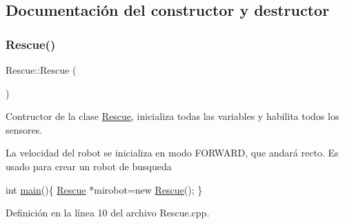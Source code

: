 \subsection{Documentación del constructor y destructor}
\mbox{\label{classRescue_a307e122659d2fbe9e17f51108951752f_a307e122659d2fbe9e17f51108951752f}} 
\subsubsection{\texorpdfstring{Rescue()}{Rescue()}}
{\footnotesize\ttfamily Rescue\+::\+Rescue (\begin{DoxyParamCaption}{ }\end{DoxyParamCaption})}



Contructor de la clase \hyperlink{classRescue}{Rescue}, inicializa todas las variables y habilita todos los sensores. 

La velocidad del robot se inicializa en modo F\+O\+R\+W\+A\+RD, que andará recto. Es usado para crear un robot de busqueda 
\begin{DoxyCode}
\textcolor{keywordtype}{int} \hyperlink{Pioneer_8cpp_a3c04138a5bfe5d72780bb7e82a18e627_a3c04138a5bfe5d72780bb7e82a18e627}{main}()\{
  \hyperlink{classRescue}{Rescue} *mirobot=\textcolor{keyword}{new} \hyperlink{classRescue_a307e122659d2fbe9e17f51108951752f_a307e122659d2fbe9e17f51108951752f}{Rescue}();
\}
\end{DoxyCode}
 

Definición en la línea 10 del archivo Rescue.\+cpp.


